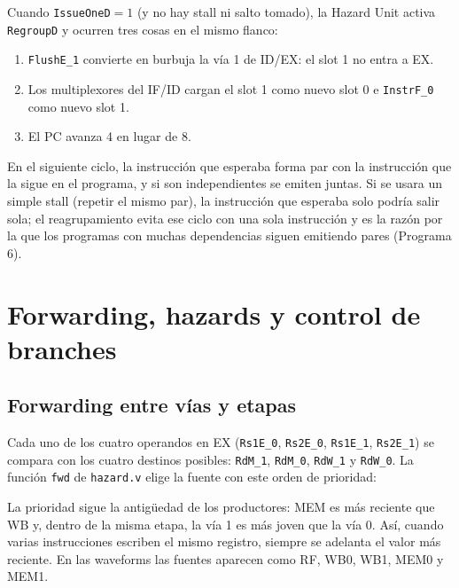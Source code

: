 \documentclass[12pt,a4paper]{article}
\begin{document}
Cuando \texttt{IssueOneD}$=1$ (y no hay stall ni salto tomado), la Hazard Unit activa \texttt{RegroupD} y ocurren tres cosas en el mismo flanco:
\begin{enumerate}
    \item \texttt{FlushE\_1} convierte en burbuja la vía 1 de ID/EX: el slot 1 no entra a EX.
    \item Los multiplexores del IF/ID cargan el slot 1 como nuevo slot 0 e \texttt{InstrF\_0} como nuevo slot 1.
    \item El PC avanza 4 en lugar de 8.
\end{enumerate}
En el siguiente ciclo, la instrucción que esperaba forma par con la instrucción que la sigue en el programa, y si son independientes se emiten juntas. Si se usara un simple stall (repetir el mismo par), la instrucción que esperaba solo podría salir sola; el reagrupamiento evita ese ciclo con una sola instrucción y es la razón por la que los programas con muchas dependencias siguen emitiendo pares (Programa 6).

\section{Forwarding, hazards y control de branches}
\label{sec:hazard}

\subsection{Forwarding entre vías y etapas}

Cada uno de los cuatro operandos en EX (\texttt{Rs1E\_0}, \texttt{Rs2E\_0}, \texttt{Rs1E\_1}, \texttt{Rs2E\_1}) se compara con los cuatro destinos posibles: \texttt{RdM\_1}, \texttt{RdM\_0}, \texttt{RdW\_1} y \texttt{RdW\_0}. La función \texttt{fwd} de \texttt{hazard.v} elige la fuente con este orden de prioridad:



\noindent La prioridad sigue la antigüedad de los productores: MEM es más reciente que WB y, dentro de la misma etapa, la vía 1 es más joven que la vía 0. Así, cuando varias instrucciones escriben el mismo registro, siempre se adelanta el valor más reciente. En las waveforms las fuentes aparecen como RF, WB0, WB1, MEM0 y MEM1.
\end{document}
